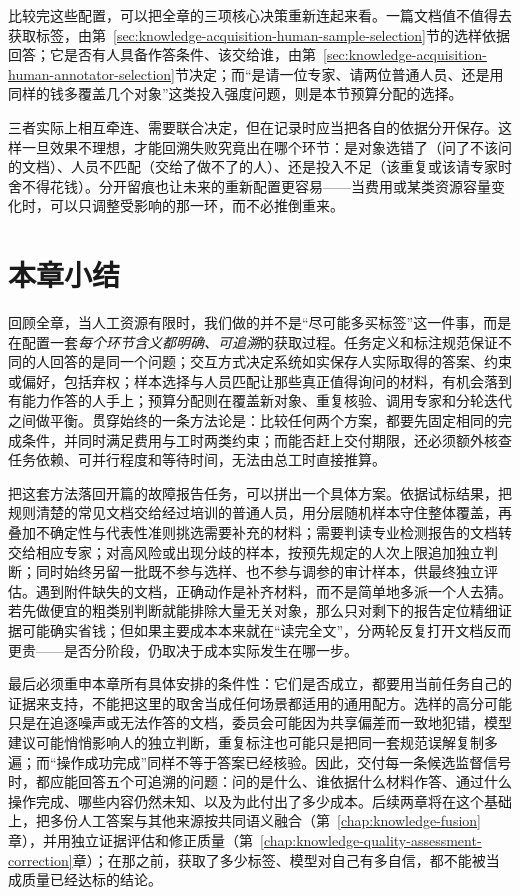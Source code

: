 比较完这些配置，可以把全章的三项核心决策重新连起来看。一篇文档值不值得去获取标签，由第~\ref{sec:knowledge-acquisition-human-sample-selection}节的选样依据回答；它是否有人具备作答条件、该交给谁，由第~\ref{sec:knowledge-acquisition-human-annotator-selection}节决定；而“是请一位专家、请两位普通人员、还是用同样的钱多覆盖几个对象”这类投入强度问题，则是本节预算分配的选择。

三者实际上相互牵连、需要联合决定，但在记录时应当把各自的依据分开保存。这样一旦效果不理想，才能回溯失败究竟出在哪个环节：是对象选错了（问了不该问的文档）、人员不匹配（交给了做不了的人）、还是投入不足（该重复或该请专家时舍不得花钱）。分开留痕也让未来的重新配置更容易——当费用或某类资源容量变化时，可以只调整受影响的那一环，而不必推倒重来。

\section{本章小结}
\label{sec:knowledge-acquisition-human-summary}

回顾全章，当人工资源有限时，我们做的并不是“尽可能多买标签”这一件事，而是在配置一套\emph{每个环节含义都明确、可追溯}的获取过程。任务定义和标注规范保证不同的人回答的是同一个问题；交互方式决定系统如实保存人实际取得的答案、约束或偏好，包括弃权；样本选择与人员匹配让那些真正值得询问的材料，有机会落到有能力作答的人手上；预算分配则在覆盖新对象、重复核验、调用专家和分轮迭代之间做平衡。贯穿始终的一条方法论是：比较任何两个方案，都要先固定相同的完成条件，并同时满足费用与工时两类约束；而能否赶上交付期限，还必须额外核查任务依赖、可并行程度和等待时间，无法由总工时直接推算。

把这套方法落回开篇的故障报告任务，可以拼出一个具体方案。依据试标结果，把规则清楚的常见文档交给经过培训的普通人员，用分层随机样本守住整体覆盖，再叠加不确定性与代表性准则挑选需要补充的材料；需要判读专业检测报告的文档转交给相应专家；对高风险或出现分歧的样本，按预先规定的人次上限追加独立判断；同时始终另留一批既不参与选样、也不参与调参的审计样本，供最终独立评估。遇到附件缺失的文档，正确动作是补齐材料，而不是简单地多派一个人去猜。若先做便宜的粗类别判断就能排除大量无关对象，那么只对剩下的报告定位精细证据可能确实省钱；但如果主要成本本来就在“读完全文”，分两轮反复打开文档反而更贵——是否分阶段，仍取决于成本实际发生在哪一步。

最后必须重申本章所有具体安排的条件性：它们是否成立，都要用当前任务自己的证据来支持，不能把这里的取舍当成任何场景都适用的通用配方。选样的高分可能只是在追逐噪声或无法作答的文档，委员会可能因为共享偏差而一致地犯错，模型建议可能悄悄影响人的独立判断，重复标注也可能只是把同一套规范误解复制多遍；而“操作成功完成”同样不等于答案已经核验。因此，交付每一条候选监督信号时，都应能回答五个可追溯的问题：问的是什么、谁依据什么材料作答、通过什么操作完成、哪些内容仍然未知、以及为此付出了多少成本。后续两章将在这个基础上，把多份人工答案与其他来源按共同语义融合（第~\ref{chap:knowledge-fusion}章），并用独立证据评估和修正质量（第~\ref{chap:knowledge-quality-assessment-correction}章）；在那之前，获取了多少标签、模型对自己有多自信，都不能被当成质量已经达标的结论。
